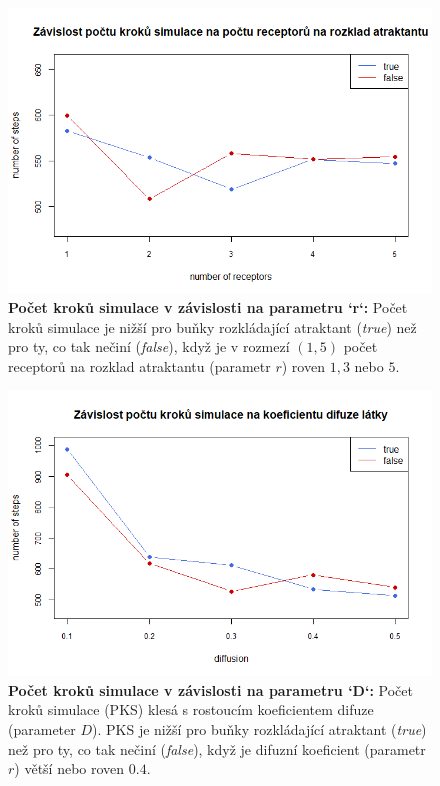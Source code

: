 \documentclass[10pt,a4paper,twocolumn]{article}
\begin{document}
\begin{figure}[tb]
  \centering
  \includegraphics[width=0.9\linewidth]{images/num_rec.png}
  \caption{\textbf{Počet kroků simulace v závislosti na parametru `r`:}
  Počet kroků simulace je nižší pro buňky rozkládající atraktant (\textit{true}) než pro ty, co tak nečiní (\textit{false}), když je v rozmezí $(1,5)$ počet receptorů na rozklad atraktantu (parametr $r$) roven $1, 3$ nebo $5$.}
  \label{fig:r}
\end{figure}

\begin{figure}[tb]
  \centering
  \includegraphics[width=0.9\linewidth]{images/difuze.png}
  \caption{\textbf{Počet kroků simulace v závislosti na parametru `D`:}
  Počet kroků simulace (PKS) klesá s rostoucím koeficientem difuze (parameter $D$). PKS je nižší pro buňky rozkládající atraktant (\textit{true}) než pro ty, co tak nečiní (\textit{false}), když je difuzní koeficient (parametr $r$) větší nebo roven $0.4$.}
  \label{fig:D}
\end{figure}
\end{document}
